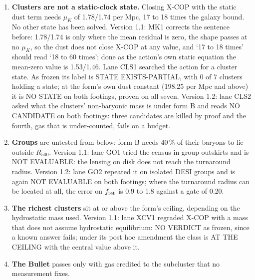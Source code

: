 \documentclass[10pt]{article}
\begin{document}
\begin{enumerate}
health at every threshold. Its comparison agrees with the audit on that visibility and with the direction of PIK1's cluster ordering, not with PIK1's mechanism or numbers: what binds is the KiDS outskirts, where the groups' threshold sits 1.15 to 1.5\,dex above what the galaxy rows allow. It lists as not computed a CMB-lensing likelihood, the coupled-gravity spectrum, SPARC and KiDS through MK1's own graders, the full constrained instability and the $a_0$-saturation regime. A re-run by the lead from a copy reproduces it; that is not an independent re-grade.
\item \textbf{Clusters are not a static-clock state.} Closing X-COP with the static dust term needs $\mu_K$ of 1.78/1.74 per Mpc, 17 to 18 times the galaxy bound. No other state has been solved. Version 1.1: MK1 corrects the sentence before: 1.78/1.74 is only where the mean residual is zero, the shape passes at no $\mu_K$, so the dust does not close X-COP at any value, and `17 to 18 times' should read `18 to 60 times'; done as the action's own static equation the mean-zero value is 1.53/1.46. Lane CLS1 searched the action for a cluster state. As frozen its label is STATE EXISTS-PARTIAL, with 0 of 7 clusters holding a state; at the form's own dust constant (198.25 per Mpc and above) it is NO STATE on both footings, proven on all seven. Version 1.2: lane CLS2 asked what the clusters' non-baryonic mass is under form B and reads NO CANDIDATE on both footings: three candidates are killed by proof and the fourth, gas that is under-counted, fails on a budget.
\item \textbf{Groups} are untested from below: form B needs 40\,\% of their baryons to lie outside $R_{500}$. Version 1.1: lane GO1 tried the census in group outskirts and is NOT EVALUABLE: the lensing on disk does not reach the turnaround radius. Version 1.2: lane GO2 repeated it on isolated DESI groups and is again NOT EVALUABLE on both footings; where the turnaround radius can be located at all, the error on $f_{\rm ret}$ is 0.9 to 1.8 against a gate of 0.20.
\item \textbf{The richest clusters} sit at or above the form's ceiling, depending on the hydrostatic mass used. Version 1.1: lane XCV1 regraded X-COP with a mass that does not assume hydrostatic equilibrium: NO VERDICT as frozen, since a known answer fails; under its post hoc amendment the class is AT THE CEILING with the central value above it.
\item \textbf{The Bullet} passes only with gas credited to the subcluster that no measurement fixes.

\end{enumerate}
\end{document}
